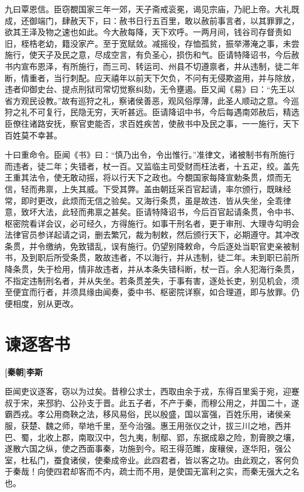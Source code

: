 \documentclass[UTF8,titlepage,oneside]{ctexbook}
\begin{document}
九曰覃恩信。臣窃覩国家三年一郊，天子斋戒衮冕，谒见宗庙，乃祀上帝。大礼既成，还御端门，肆赦天下，曰：赦书日行五百里，敢以赦前事言者，以其罪罪之，欲其王泽及物之速也如此。今大赦每降，天下欢呼。一两月间，钱谷司存督责如旧，桎梏老幼，籍没家产。至于宽赋敛。减摇役，存恤孤贫，振举滞淹之事，未尝施行，使天子及民之意，尽成空言，有负圣心，损伤和气。臣请特降诏书，今后赦书内宣布恩泽，有所施行，而三司、转运司、州县不切遵禀者，井从违制，徒二年断，情重者，当行刺配。应天禧年以前天下欠负，不问有无侵欺盗用，并与除放，违者仰御史台、提点刑狱司常切觉察纠劾，无令壅遏。臣又闻《易》曰：“先王以省方观民设教。”故有巡狩之礼，察诸侯善恶，观风俗厚薄，此圣人顺动之意。今巡狩之礼不可复行，民隐无穷，天听甚远。臣请降诏中书，今后每遇南郊赦后，精选臣僚往诸路安抚，察官吏能否，求百姓疾苦，使赦书中及民之事，一一施行，天下百姓莫不幸甚。


十曰重命令。臣闻《书》曰：“慎乃出令，令出惟行。”准律文，诸被制书有所施行而违者，徒二年；失错者，杖一百。又监临主司受财而枉法者，十五疋，绞。盖先王重其法令，使无敢动摇，将以行天下之政也。今覩国家每降宣勅条贯，烦而无信，轻而弗禀，上失其威。下受其弊。盖由朝廷采百官起请，率尔颁行，既昧经常，即时更改，此烦而无信之验矣。又海行条贯，虽是故违．皆从失坐，全乖律意，致坏大法，此轻而弗禀之甚矣。臣请特降诏书，今后百官起请条贯，令中书、枢密院看详会议，必可经久，方得施行。如事干刑名者，更于审刑、大理寺勾明会法律官员参详起请之词，删去繁冗，裁为制敕，然后颁行天下，必期遵守。其冲改条贯，并令缴纳，免致错乱，误有施行。仍望别降敕命，今后逐处当职官吏亲被制书，及到职后所受条贯，敢故违者，不以海行，并从违制，徒二年。未到职已前所降条贯，失于检用，情非故违者，并从本条失错科断，杖一百。余人犯海行条贯，不指定违制刑名者，并从失坐。若条贯差失，于事有害，逐处长吏，别见机会，须至便宜而行者，并须具缘由闻奏，委中书、枢密院详察，如合理道，即与放罪。仍便相度，别从更改。



\chapter*{谏逐客书}
\begin{center}
	\textbf{[秦朝]李斯}
\end{center}

臣闻吏议逐客，窃以为过矣。昔穆公求士，西取由余于戎，东得百里奚于宛，迎蹇叔于宋，来邳豹、公孙支于晋。此五子者，不产于秦，而穆公用之，并国二十，遂霸西戎。孝公用商鞅之法，移风易俗，民以殷盛，国以富强，百姓乐用，诸侯亲服，获楚、魏之师，举地千里，至今治强。惠王用张仪之计，拔三川之地，西并巴、蜀，北收上郡，南取汉中，包九夷，制鄢、郢，东据成皋之险，割膏腴之壤，遂散六国之纵，使之西面事秦，功施到今。昭王得范雎，废穰侯，逐华阳，强公室，杜私门，蚕食诸侯，使秦成帝业。此四君者，皆以客之功。由此观之，客何负于秦哉！向使四君却客而不内，疏士而不用，是使国无富利之实，而秦无强大之名也。
\end{document}
